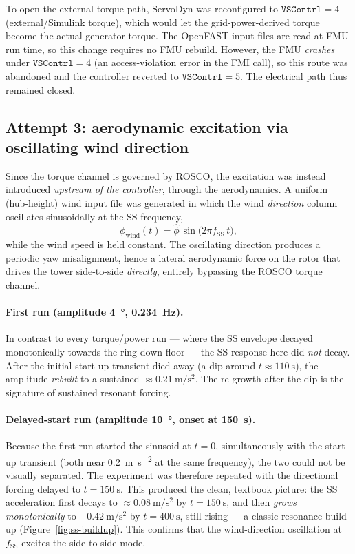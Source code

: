 To open the external-torque path, ServoDyn was reconfigured to
$\texttt{VSContrl}=4$ (external/Simulink torque), which would let the
grid-power-derived torque become the actual generator torque. The OpenFAST
input files are read at FMU run time, so this change requires no FMU rebuild.
However, the FMU \emph{crashes} under $\texttt{VSContrl}=4$ (an access-violation
error in the FMI call), so this route was abandoned and the controller reverted
to $\texttt{VSContrl}=5$. The electrical path thus remained closed.

\subsection{Attempt 3: aerodynamic excitation via oscillating wind direction}
\label{subsec:of-winddir}

Since the torque channel is governed by ROSCO, the excitation was instead
introduced \emph{upstream of the controller}, through the aerodynamics. A
uniform (hub-height) wind input file was generated in which the wind
\emph{direction} column oscillates sinusoidally at the SS frequency,
\begin{equation}
  \phi_{\mathrm{wind}}(t) = \hat{\phi}\,\sin\!\big(2\pi f_{\mathrm{SS}}\, t\big),
  \label{eq:winddir}
\end{equation}
while the wind speed is held constant. The oscillating direction produces a
periodic yaw misalignment, hence a lateral aerodynamic force on the rotor that
drives the tower side-to-side \emph{directly}, entirely bypassing the ROSCO
torque channel.

\paragraph{First run (amplitude \SI{4}{\degree}, \SI{0.234}{\hertz}).}
In contrast to every torque/power run --- where the SS envelope decayed
monotonically towards the ring-down floor --- the SS response here did
\emph{not} decay. After the initial start-up transient died away (a dip around
$t\approx\SI{110}{\second}$), the amplitude \emph{rebuilt} to a sustained
$\approx\SI{0.21}{\metre\per\second\squared}$. The re-growth after the dip is
the signature of sustained resonant forcing.

\paragraph{Delayed-start run (amplitude \SI{10}{\degree}, onset at
\SI{150}{\second}).}
Because the first run started the sinusoid at $t=0$, simultaneously with the
start-up transient (both near \SI{0.2}{\metre\per\second\squared} at the same
frequency), the two could not be visually separated. The experiment was
therefore repeated with the directional forcing delayed to
$t=\SI{150}{\second}$. This produced the clean, textbook picture: the SS
acceleration first decays to $\approx\SI{0.08}{\metre\per\second\squared}$ by
$t=\SI{150}{\second}$, and then \emph{grows monotonically} to
$\pm\SI{0.42}{\metre\per\second\squared}$ by $t=\SI{400}{\second}$, still
rising --- a classic resonance build-up (Figure~\ref{fig:ss-buildup}). This
confirms that the wind-direction oscillation at $f_{\mathrm{SS}}$ excites the
side-to-side mode.

